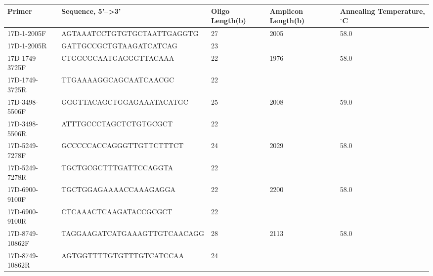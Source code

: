 \footnotesize
	\begin{tabu} to \columnwidth {X[1,l]X[2.5,l]X[.75,l]X[.5,l]X[l]}
			
	\rowfont[1]{\bfseries}
	\toprule
		Primer          & Sequence, 5'--\textgreater3' & Oligo Length(b) & Amplicon Length(b) & Annealing Temperature, $^{\circ}$C \\ \midrule
		17D-1-2005F     & AGTAAATCCTGTGTGCTAATTGAGGTG  & 27              & 2005               & 58.0                      \\
		17D-1-2005R     & GATTGCCGCTGTAAGATCATCAG      & 23              &                    &                           \\
		17D-1749-3725F  & CTGGCGCAATGAGGGTTACAAA       & 22              & 1976               & 58.0                      \\
		17D-1749-3725R  & TTGAAAAGGCAGCAATCAACGC       & 22              &                    &                           \\
		17D-3498-5506F  & GGGTTACAGCTGGAGAAATACATGC    & 25              & 2008               & 59.0                      \\
		17D-3498-5506R  & ATTTGCCCTAGCTCTGTGCGCT       & 22              &                    &                           \\
		17D-5249-7278F  & GCCCCCACCAGGGTTGTTCTTTCT     & 24              & 2029               & 58.0                      \\
		17D-5249-7278R  & TGCTGCGCTTTGATTCCAGGTA       & 22              &                    &                           \\
		17D-6900-9100F  & TGCTGGAGAAAACCAAAGAGGA       & 22              & 2200               & 58.0                      \\
		17D-6900-9100R  & CTCAAACTCAAGATACCGCGCT       & 22              &                    &                           \\
		17D-8749-10862F & TAGGAAGATCATGAAAGTTGTCAACAGG & 28              & 2113               & 58.0                      \\
		17D-8749-10862R & AGTGGTTTTGTGTTTGTCATCCAA     & 24              &                    &                           \\ \bottomrule
	\end{tabu}

